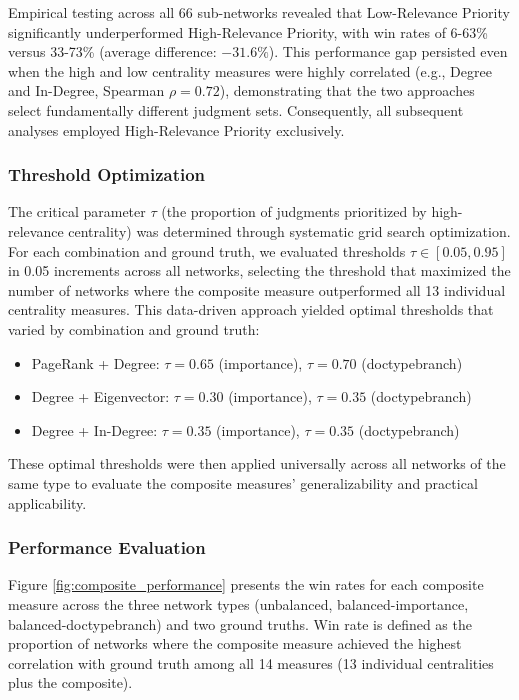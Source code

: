 Empirical testing across all 66 sub-networks revealed that Low-Relevance Priority significantly underperformed High-Relevance Priority, with win rates of 6-63\% versus 33-73\% (average difference: $-31.6\%$). This performance gap persisted even when the high and low centrality measures were highly correlated (e.g., Degree and In-Degree, Spearman $\rho=0.72$), demonstrating that the two approaches select fundamentally different judgment sets. Consequently, all subsequent analyses employed High-Relevance Priority exclusively.

\subsubsection{Threshold Optimization}

The critical parameter $\tau$ (the proportion of judgments prioritized by high-relevance centrality) was determined through systematic grid search optimization. For each combination and ground truth, we evaluated thresholds $\tau \in [0.05, 0.95]$ in 0.05 increments across all networks, selecting the threshold that maximized the number of networks where the composite measure outperformed all 13 individual centrality measures. This data-driven approach yielded optimal thresholds that varied by combination and ground truth:

\begin{itemize}
\item PageRank + Degree: $\tau = 0.65$ (importance), $\tau = 0.70$ (doctypebranch)
\item Degree + Eigenvector: $\tau = 0.30$ (importance), $\tau = 0.35$ (doctypebranch)  
\item Degree + In-Degree: $\tau = 0.35$ (importance), $\tau = 0.35$ (doctypebranch)
\end{itemize}

These optimal thresholds were then applied universally across all networks of the same type to evaluate the composite measures' generalizability and practical applicability.

\subsubsection{Performance Evaluation}

Figure \ref{fig:composite_performance} presents the win rates for each composite measure across the three network types (unbalanced, balanced-importance, balanced-doctypebranch) and two ground truths. Win rate is defined as the proportion of networks where the composite measure achieved the highest correlation with ground truth among all 14 measures (13 individual centralities plus the composite).

